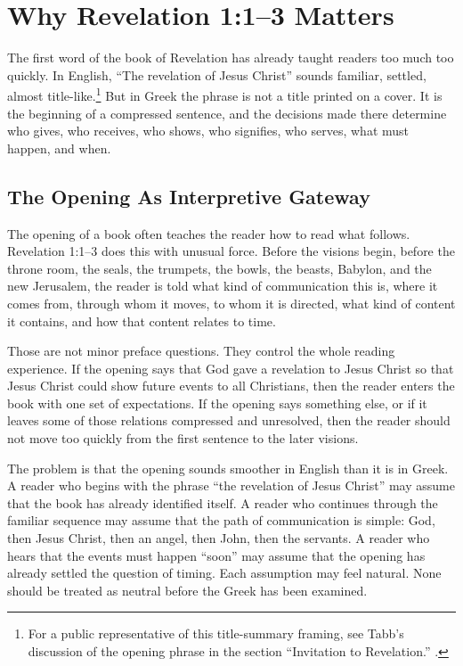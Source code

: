 \chapter{Why Revelation 1:1--3 Matters}

The first word of the book of Revelation has already taught readers too much too quickly. In English, ``The revelation of Jesus Christ'' sounds familiar, settled, almost title-like.\footnote{For a public representative of this title-summary framing, see Tabb's discussion of the opening phrase in the section ``Invitation to Revelation.'' \autocite{tabbTgcRevelation}.} But in Greek the phrase is not a title printed on a cover. It is the beginning of a compressed sentence, and the decisions made there determine who gives, who receives, who shows, who signifies, who serves, what must happen, and when.

\section{The Opening As Interpretive Gateway}

The opening of a book often teaches the reader how to read what follows. Revelation 1:1--3 does this with unusual force. Before the visions begin, before the throne room, the seals, the trumpets, the bowls, the beasts, Babylon, and the new Jerusalem, the reader is told what kind of communication this is, where it comes from, through whom it moves, to whom it is directed, what kind of content it contains, and how that content relates to time.

Those are not minor preface questions. They control the whole reading experience. If the opening says that God gave a revelation to Jesus Christ so that Jesus Christ could show future events to all Christians, then the reader enters the book with one set of expectations. If the opening says something else, or if it leaves some of those relations compressed and unresolved, then the reader should not move too quickly from the first sentence to the later visions.

The problem is that the opening sounds smoother in English than it is in Greek. A reader who begins with the phrase ``the revelation of Jesus Christ'' may assume that the book has already identified itself. A reader who continues through the familiar sequence may assume that the path of communication is simple: God, then Jesus Christ, then an angel, then John, then the servants. A reader who hears that the events must happen ``soon'' may assume that the opening has already settled the question of timing. Each assumption may feel natural. None should be treated as neutral before the Greek has been examined.

